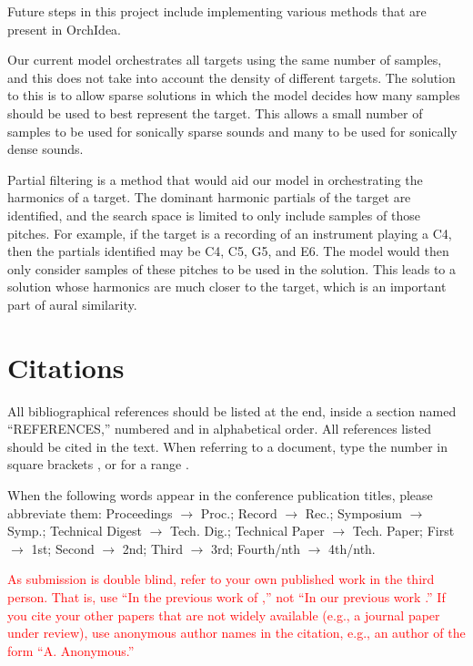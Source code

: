\documentclass{article}
\begin{document}
Future steps in this project include implementing various methods that are present in OrchIdea. 

Our current model orchestrates all targets using the same number of samples, and this does not take into account the density of different targets. The solution to this is to allow sparse solutions in which the model decides how many samples should be used to best represent the target. This allows a small number of samples to be used for sonically sparse sounds and many to be used for sonically dense sounds. 

Partial filtering is a method that would aid our model in orchestrating the harmonics of a target. The dominant harmonic partials of the target are identified, and the search space is limited to only include samples of those pitches. For example, if the target is a recording of an instrument playing a C4, then the partials identified may be C4, C5, G5, and E6. The model would then only consider samples of these pitches to be used in the solution. This leads to a solution whose harmonics are much closer to the target, which is an important part of aural similarity.

\section{Citations}

All bibliographical references should be listed at the end,
inside a section named ``REFERENCES,'' numbered and in alphabetical order.
All references listed should be cited in the text.
When referring to a document, type the number in square brackets
\cite{Author:00}, or for a range \cite{Author:00,Someone:10,Someone:04}.

When the following words appear in the conference publication titles, please abbreviate them: Proceedings $\rightarrow$ Proc.; Record $\rightarrow$ Rec.; Symposium $\rightarrow$ Symp.; Technical Digest $\rightarrow$ Tech. Dig.; Technical Paper $\rightarrow$ Tech. Paper; First $\rightarrow$ 1st; Second $\rightarrow$ 2nd; Third $\rightarrow$ 3rd; Fourth/nth $\rightarrow$ 4th/nth.

\textcolor{red}{As submission is double blind, refer to your own published work in the third person. That is, use ``In the previous work of \cite{Someone:10},'' not ``In our previous work \cite{Someone:10}.'' If you cite your other papers that are not widely available (e.g., a journal paper under review), use anonymous author names in the citation, e.g., an author of the form ``A. Anonymous.''}



%
%
%
%
\end{document}
